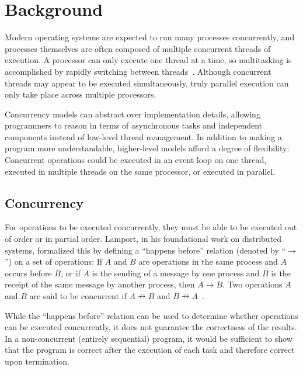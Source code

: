 \documentclass{sig-alternate}
\begin{document}
\section{Background}

Modern operating systems are expected to run many processes concurrently, and processes themselves are often composed of multiple concurrent threads of execution. A processor can only execute one thread at a time, so multitasking is accomplished by rapidly switching between threads~\cite{Liu1973}. Although concurrent threads may appear to be executed simultaneously, truly parallel execution can only take place across multiple processors.

Concurrency models can abstract over implementation details, allowing programmers to reason in terms of asynchronous tasks and independent components instead of low-level thread management. In addition to making a program more understandable, higher-level models afford a degree of flexibility: Concurrent operations could be executed in an event loop on one thread, executed in multiple threads on the same processor, or executed in parallel.

\subsection{Concurrency}

For operations to be executed concurrently, they must be able to be executed out of order or in partial order. Lamport, in his foundational work on distributed systems, formalized this by defining a ``happens before'' relation (denoted by ``$\rightarrow$'') on a set of operations: If $A$ and $B$ are operations in the same process and $A$ occurs before $B$, or if $A$ is the sending of a message by one process and $B$ is the receipt of the same message by another process, then $A \rightarrow B$. Two operations $A$ and $B$ are said to be concurrent if $A \nrightarrow B$ and $B \nrightarrow A$~\cite{Lamport1978}.

While the ``happens before'' relation can be used to determine whether operations can be executed concurrently, it does not guarantee the correctness of the results. In a non-concurrent (entirely sequential) program, it would be sufficient to show that the program is correct after the execution of each task and therefore correct upon termination.
\end{document}
